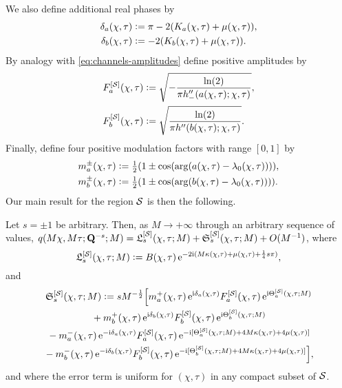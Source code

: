 We also define additional real phases by
\begin{equation}
\begin{split}
\delta_a(\chi,\tau)&\vcentcolon= \pi-2(K_a(\chi,\tau)+\mu(\chi,\tau)),\\
\delta_b(\chi,\tau)&\vcentcolon= -2(K_b(\chi,\tau)+\mu(\chi,\tau)).
\end{split}
\end{equation}
By analogy with \eqref{eq:channels-amplitudes} define positive amplitudes by
\begin{equation}
\begin{split}
F_a^{[\mathcal{S}]}(\chi,\tau)&\vcentcolon= \sqrt{-\frac{\ln(2)}{\pi h''_-(a(\chi,\tau);\chi,\tau)}},\\
F_b^{[\mathcal{S}]}(\chi,\tau)&\vcentcolon= \sqrt{\frac{\ln(2)}{\pi h''(b(\chi,\tau);\chi,\tau)}}.
\end{split}
\end{equation}
Finally, define four positive modulation factors with range $[0,1]$ by
\begin{equation}
\begin{split}
m_a^\pm(\chi,\tau)&\defeq\tfrac{1}{2}\left(1\pm\cos\left(\arg\left(a(\chi,\tau)-\lambda_0(\chi,\tau)\right)\right)\right),\\
m_b^\pm(\chi,\tau)&\defeq\tfrac{1}{2}\left(1\pm\cos\left(\arg\left(b(\chi,\tau)-\lambda_0(\chi,\tau)\right)\right)\right).
\end{split}
\label{eq:m-a-b-shelves}
\end{equation}
Our main result for the region $\mathcal{S}$ is then the following.
\begin{theorem}
Let $s=\pm 1$ be arbitrary.  Then, as $M\to+\infty$ through an arbitrary sequence of values,
$q(M\chi,M\tau;\mathbf{Q}^{-s};M)=\mathfrak{L}_s^{[\mathcal{S}]}(\chi,\tau;M)+\mathfrak{S}_s^{[\mathcal{S}]}(\chi,\tau;M) + O(M^{-1})$, where
\begin{equation}
\mathfrak{L}_s^{[\mathcal{S}]}(\chi,\tau;M)\vcentcolon= B(\chi,\tau)\,\mathrm{e}^{-2\mathrm{i} (M\kappa(\chi,\tau)+\mu(\chi,\tau)+\frac{1}{4}s\pi)},
\label{eq:leading-term-shelves-q}
\end{equation}
and 
\begin{multline}
\mathfrak{S}_s^{[\mathcal{S}]}(\chi,\tau;M)\vcentcolon= sM^{-\frac{1}{2}}\Big[m_a^+(\chi,\tau)\,\mathrm{e}^{\mathrm{i}\delta_a(\chi,\tau)}F_a^{[\mathcal{S}]}(\chi,\tau)\,\mathrm{e}^{\mathrm{i}\Theta_a^{[\mathcal{S}]}(\chi,\tau;M)} \\
{}+ m_b^+(\chi,\tau)\,\mathrm{e}^{\mathrm{i}\delta_b(\chi,\tau)}F_b^{[\mathcal{S}]}(\chi,\tau)\,\mathrm{e}^{\mathrm{i}\Theta_b^{[\mathcal{S}]}(\chi,\tau;M)} \\
{}- m_a^-(\chi,\tau)\,\mathrm{e}^{-\mathrm{i}\delta_a(\chi,\tau)}F_a^{[\mathcal{S}]}(\chi,\tau)\,\mathrm{e}^{-\mathrm{i}[\Theta_a^{[\mathcal{S}]}(\chi,\tau;M)+4M\kappa(\chi,\tau)+4\mu(\chi,\tau)]} \\
{}- m_b^-(\chi,\tau)\,\mathrm{e}^{-\mathrm{i}\delta_b(\chi,\tau)}F_b^{[\mathcal{S}]}(\chi,\tau)\,\mathrm{e}^{-\mathrm{i}[\Theta_b^{[\mathcal{S}]}(\chi,\tau;M)+4M\kappa(\chi,\tau)+4\mu(\chi,\tau)]}\Big],
\label{eq:subleading-term-shelves-q}
\end{multline}
and where the error term is uniform for $(\chi,\tau)$ in any compact subset of $\mathcal{S}$.
\label{thm:shelves}
\end{theorem}
